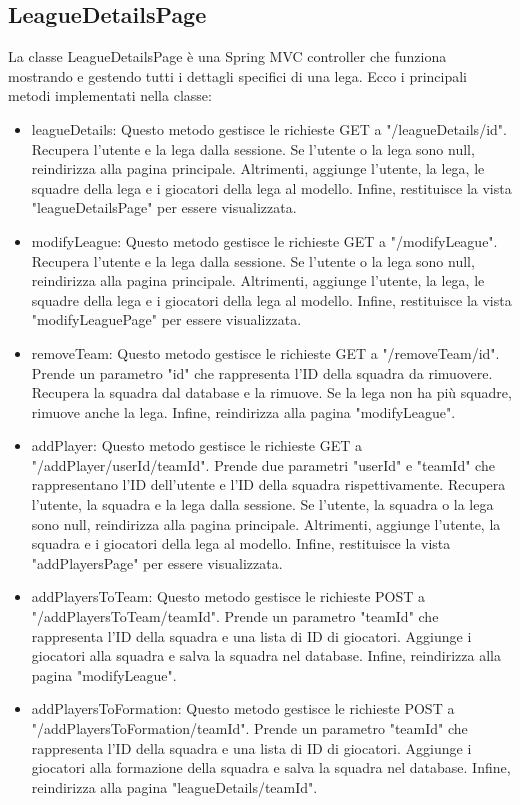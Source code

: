 \documentclass[twoside,openright,titlepage,fleqn,headinclude,12pt,a4paper,BCOR=5mm,footinclude]{scrbook}
\begin{document}
\subsection{LeagueDetailsPage} 
La classe LeagueDetailsPage è una Spring MVC controller che funziona mostrando e gestendo tutti i dettagli specifici di una lega. Ecco i principali metodi implementati nella classe:  
\begin{itemize}  
    \item leagueDetails: Questo metodo gestisce le richieste GET a "/leagueDetails/{id}". Recupera l'utente e la lega dalla sessione. Se l'utente o la lega sono null, reindirizza alla pagina principale. Altrimenti, aggiunge l'utente, la lega, le squadre della lega e i giocatori della lega al modello. Infine, restituisce la vista "leagueDetailsPage" per essere visualizzata. 
    \item modifyLeague: Questo metodo gestisce le richieste GET a "/modifyLeague". Recupera l'utente e la lega dalla sessione. Se l'utente o la lega sono null, reindirizza alla pagina principale. Altrimenti, aggiunge l'utente, la lega, le squadre della lega e i giocatori della lega al modello. Infine, restituisce la vista "modifyLeaguePage" per essere visualizzata. 
    \item removeTeam: Questo metodo gestisce le richieste GET a "/removeTeam/{id}". Prende un parametro "id" che rappresenta l'ID della squadra da rimuovere. Recupera la squadra dal database e la rimuove. Se la lega non ha più squadre, rimuove anche la lega. Infine, reindirizza alla pagina "modifyLeague". 
    \item addPlayer: Questo metodo gestisce le richieste GET a "/addPlayer/{userId}/{teamId}". Prende due parametri "userId" e "teamId" che rappresentano l'ID dell'utente e l'ID della squadra rispettivamente. Recupera l'utente, la squadra e la lega dalla sessione. Se l'utente, la squadra o la lega sono null, reindirizza alla pagina principale. Altrimenti, aggiunge l'utente, la squadra e i giocatori della lega al modello. Infine, restituisce la vista "addPlayersPage" per essere visualizzata. 
    \item addPlayersToTeam: Questo metodo gestisce le richieste POST a "/addPlayersToTeam/{teamId}". Prende un parametro "teamId" che rappresenta l'ID della squadra e una lista di ID di giocatori. Aggiunge i giocatori alla squadra e salva la squadra nel database. Infine, reindirizza alla pagina "modifyLeague". 
    \item addPlayersToFormation: Questo metodo gestisce le richieste POST a "/addPlayersToFormation/{teamId}". Prende un parametro "teamId" che rappresenta l'ID della squadra e una lista di ID di giocatori. Aggiunge i giocatori alla formazione della squadra e salva la squadra nel database. Infine, reindirizza alla pagina "leagueDetails/{teamId}". 

\end{itemize}
\end{document}
